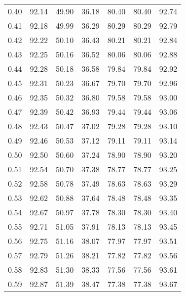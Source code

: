 \begin{tabular}{|c|c|c|c|c|c|c|}
      0.40 &     92.14 &     49.90 &      36.18 &   80.40 &      80.40 &         92.74 \\
      0.41 &     92.18 &     49.99 &      36.29 &   80.29 &      80.29 &         92.79 \\
      0.42 &     92.22 &     50.10 &      36.43 &   80.21 &      80.21 &         92.84 \\
      0.43 &     92.25 &     50.16 &      36.52 &   80.06 &      80.06 &         92.88 \\
      0.44 &     92.28 &     50.18 &      36.58 &   79.84 &      79.84 &         92.92 \\
      0.45 &     92.31 &     50.23 &      36.67 &   79.70 &      79.70 &         92.96 \\
      0.46 &     92.35 &     50.32 &      36.80 &   79.58 &      79.58 &         93.00 \\
      0.47 &     92.39 &     50.42 &      36.93 &   79.44 &      79.44 &         93.06 \\
      0.48 &     92.43 &     50.47 &      37.02 &   79.28 &      79.28 &         93.10 \\
      0.49 &     92.46 &     50.53 &      37.12 &   79.11 &      79.11 &         93.14 \\
      0.50 &     92.50 &     50.60 &      37.24 &   78.90 &      78.90 &         93.20 \\
      0.51 &     92.54 &     50.70 &      37.38 &   78.77 &      78.77 &         93.25 \\
      0.52 &     92.58 &     50.78 &      37.49 &   78.63 &      78.63 &         93.29 \\
      0.53 &     92.62 &     50.88 &      37.64 &   78.48 &      78.48 &         93.35 \\
      0.54 &     92.67 &     50.97 &      37.78 &   78.30 &      78.30 &         93.40 \\
      0.55 &     92.71 &     51.05 &      37.91 &   78.13 &      78.13 &         93.45 \\
      0.56 &     92.75 &     51.16 &      38.07 &   77.97 &      77.97 &         93.51 \\
      0.57 &     92.79 &     51.26 &      38.21 &   77.82 &      77.82 &         93.56 \\
      0.58 &     92.83 &     51.30 &      38.33 &   77.56 &      77.56 &         93.61 \\
      0.59 &     92.87 &     51.39 &      38.47 &   77.38 &      77.38 &         93.67 \\

\end{tabular}
